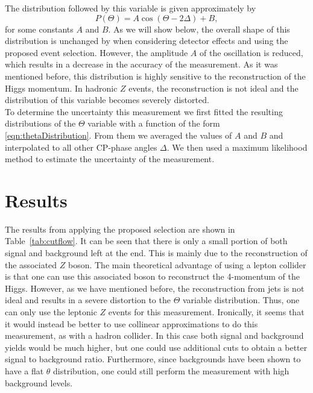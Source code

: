 \documentclass[preprintnumbers,nofootinbib,noshowpacs,eqsecnum,prd,superscriptaddress,letterpaper]{revtex4}
\begin{document}
The distribution followed by this variable is given approximately by
\begin{equation}
P(\Theta)=A\cos(\Theta-2\Delta)+B,\label{eqn:thetaDistribution}
\end{equation}
for some constants $A$ and $B$. As we will show below, the overall shape of this distribution is unchanged by when considering detector effects and using the proposed event selection. However, the amplitude $A$ of the oscillation is reduced, which results in a decrease in the accuracy of the measurement. As it was mentioned before, this distribution is highly sensitive to the reconstruction of the Higgs momentum. In hadronic $Z$ events, the reconstruction is not ideal and the distribution of this variable becomes severely distorted.\\

To determine the uncertainty this measurement we first fitted the resulting distributions of the $\Theta$ variable with a function of the form \ref{eqn:thetaDistribution}. From them we averaged the values of $A$ and $B$ and interpolated to all other CP-phase angles $\Delta$. We then used a maximum likelihood method to estimate the uncertainty of the measurement.

\section{Results}
\label{sec:results}

The results from applying the proposed selection are shown in Table~\ref{tab:cutflow}. It can be seen that there is only a small portion of both signal and background left at the end. This is mainly due to the reconstruction of the associated $Z$ boson. The main theoretical advantage of using a lepton collider is that one can use this associated boson to reconstruct the 4-momentum of the Higgs. However, as we have mentioned before, the reconstruction from jets is not ideal and results in a severe distortion to the $\Theta$ variable distribution. Thus, one can only use the leptonic $Z$ events for this measurement. Ironically, it seems that it would instead be better to use collinear approximations to do this measurement, as with a hadron collider. In this case both signal and background yields would be much higher, but one could use additional cuts to obtain a better signal to background ratio. Furthermore, since backgrounds have been shown to have a flat $\theta$ distribution, one could still perform the measurement with high background levels.\\
\end{document}
